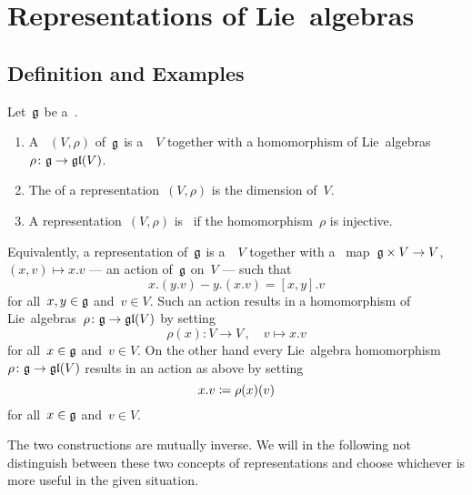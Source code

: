 \section{Representations of Lie~algebras}











\subsection{Definition and Examples}


\begin{definition}
  Let~$\mathfrak{g}$ be a~{\liealgebra{$\kf$}}.
  \begin{enumerate}
    \item
      A ~$(V, \rho)$ of~$\mathfrak{g}$ is a~{\vectorspace{$\kf$}}~$V$ together with a homomorphism of Lie~algebras~$\rho \colon \mathfrak{g} \to \mathfrak{gl}(V)$.
    \item
      The  of a representation~$(V, \rho)$ is the dimension of~$V$.
    \item
      A representation~$(V, \rho)$ is~ if the homomorphism~$\rho$ is injective.
  \end{enumerate}
\end{definition}


\begin{remark}
  Equivalently, a representation of~$\mathfrak{g}$ is a~{\vectorspace{$\kf$}}~$V$ together with a~{\bilinear{$\kf$}} map~$\mathfrak{g} \times V \to V$,~$(x,v) \mapsto x.v$ --- an action of~$\mathfrak{g}$ on~$V$ --- such that
  \begin{equation}
  \label{representation via action}
    x.(y.v) - y.(x.v)
    =
    [x,y].v
  \end{equation}
  for all~$x, y \in \mathfrak{g}$ and~$v \in V$.
  Such an action results in a homomorphism of Lie~algebras~$\rho \colon \mathfrak{g} \to \mathfrak{gl}(V)$ by setting
  \[
    \rho(x)
    \colon
    V
    \to
    V \,,
    \quad
    v
    \mapsto
    x.v
  \]
  for all~$x \in \mathfrak{g}$ and~$v \in V$.
  On the other hand every Lie~algebra homomorphism~$\rho \colon \mathfrak{g} \to \mathfrak{gl}(V)$ results in an action as above by setting
  \[
    x.v
    \coloneqq
    \rho(x)(v)
  \]
  for all~$x \in \mathfrak{g}$ and~$v \in V$.
  
  The two constructions are mutually inverse.
  We will in the following not distinguish between these two concepts of representations and choose whichever is more useful in the given situation.
\end{remark}



